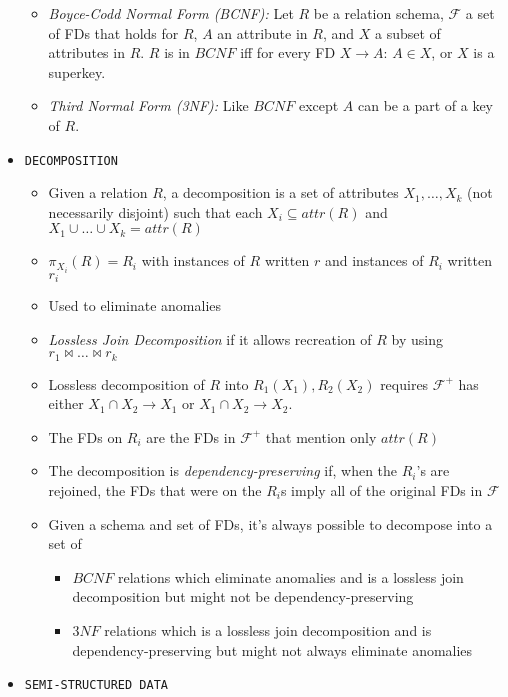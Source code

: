 \documentclass[landscape,8pt]{extarticle}
\newcommand{\code}{\lstinline}
\begin{document}
\begin{multicols}{4}
\begin{itemize}
\begin{itemize}
        \item \emph{Boyce-Codd Normal Form (BCNF):} Let $R$ be a relation schema, $\mathcal{F}$ a
        set of FDs that holds for $R$, $A$ an attribute in $R$, and $X$ a subset of attributes in
        $R$. $R$ is in $BCNF$ iff for every FD $X \rightarrow A$: $A \in X$, or $X$ is a superkey.
        \item \emph{Third Normal Form (3NF):} Like $BCNF$ except $A$ can be a part of a key of $R$.
    \end{itemize}
    \item \code{DECOMPOSITION}
    \begin{itemize}
        \item Given a relation $R$, a decomposition is a set of attributes $X_1, \dots, X_k$ (not
        necessarily disjoint) such that each $X_i \subseteq attr(R)$ and $X_1 \cup \dots \cup X_k =
        attr(R)$
        \item $\pi_{X_i}(R) = R_i$ with instances of $R$ written $r$ and instances of $R_i$ written $r_i$
        \item Used to eliminate anomalies
        \item \emph{Lossless Join Decomposition} if it allows recreation of $R$ by using $r_1
        \bowtie \dots \bowtie r_k$
        \item Lossless decomposition of $R$ into $R_1(X_1), R_2(X_2)$ requires $\mathcal{F}^+$ has
        either $X_1 \cap X_2 \rightarrow X_1$ or $X_1 \cap X_2 \rightarrow X_2$.
        \item The FDs on $R_i$ are the FDs in $\mathcal{F}^+$ that mention only $attr(R)$
        \item The decomposition is \emph{dependency-preserving} if, when the $R_i$'s are rejoined,
        the FDs that were on the $R_i$s imply all of the original FDs in $\mathcal{F}$
        \item Given a schema and set of FDs, it's always possible to decompose into a set of 
        \begin{itemize}
            \item $BCNF$ relations which eliminate anomalies and is a lossless join decomposition
            but might not be dependency-preserving
            \item $3NF$ relations which is a lossless join decomposition and is
            dependency-preserving but might not always eliminate anomalies
        \end{itemize}
    \end{itemize}
    \item \code{SEMI-STRUCTURED DATA}

\end{itemize}
\end{multicols}
\end{document}
